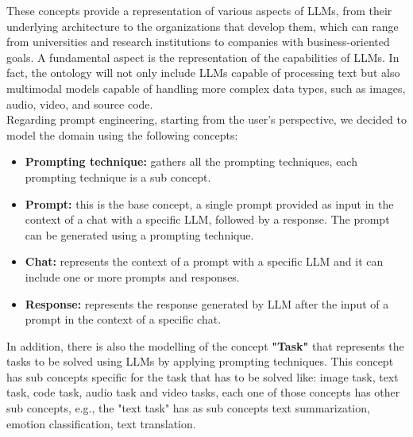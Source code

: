 These concepts provide a representation of various aspects of LLMs, from their underlying architecture to the organizations that develop them, which can range from universities and research institutions to companies with business-oriented goals.
A fundamental aspect is the representation of the capabilities of LLMs.
In fact, the ontology will not only include LLMs capable of processing text but also multimodal models capable of handling more complex data types, such as images, audio, video, and source code.\\
Regarding prompt engineering, starting from the user's perspective, we decided to model the domain using the following concepts:
\begin{itemize}
    \item \textbf{Prompting technique:} gathers all the prompting techniques, each prompting technique is a sub concept.

    \item \textbf{Prompt:} this is the base concept, a single prompt provided as input in the context of a chat with a specific LLM, followed by a response. The prompt can be generated using a prompting technique.

    \item \textbf{Chat:} represents the context of a prompt with a specific LLM and it can include one or more prompts and responses.

    \item \textbf{Response:} represents the response generated by LLM after the input of a prompt in the context of a specific chat.
\end{itemize}


In addition, there is also the modelling of the concept \textbf{"Task"} that represents the tasks to be solved using LLMs by applying prompting techniques.
This concept has sub concepts specific for the task that has to be solved like: image task, text task, code task, audio task and video tasks, each one of those concepts has other sub concepts, e.g., the "text task" has as sub concepts text summarization, emotion classification, text translation.

